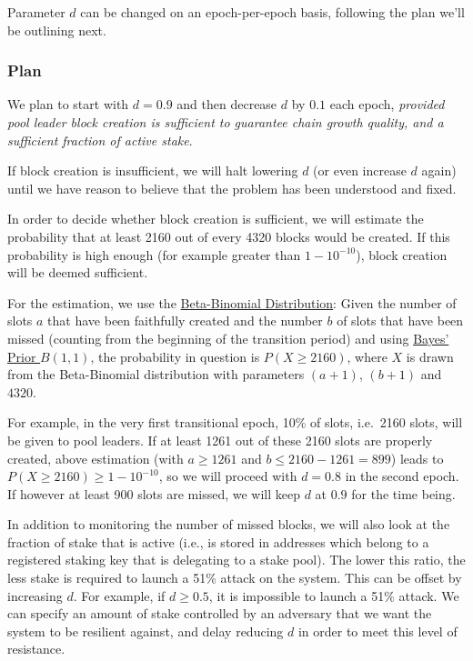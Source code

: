 \documentclass[11pt,a4paper]{article}
\begin{document}
Parameter \(d\) can be changed on an epoch-per-epoch basis, following
the plan we'll be outlining next.

\subsubsection{Plan}
\label{plan}

We plan to start with \(d=0.9\) and then decrease \(d\) by \(0.1\) each
epoch, \emph{provided pool leader block creation is sufficient to
guarantee chain growth quality, and a sufficient fraction of active
stake}.

If block creation is insufficient, we will halt lowering \(d\) (or even
increase \(d\) again) until we have reason to believe that the problem
has been understood and fixed.

In order to decide whether block creation is sufficient, we will
estimate the probability that at least 2160 out of every 4320 blocks
would be created. If this probability is high enough (for example
greater than \(1 - 10^{-10}\)), block creation will be deemed
sufficient.

For the estimation, we use the
\href{https://en.wikipedia.org/wiki/Beta-binomial_distribution}{Beta-Binomial
Distribution}: Given the number of slots \(a\) that have been faithfully
created and the number \(b\) of slots that have been missed (counting
from the beginning of the transition period) and using
\href{https://en.wikipedia.org/wiki/Beta_distribution\#Bayes'_prior_probability_(Beta(1,1))}{Bayes'
Prior \(B(1,1)\)}, the probability in question is \(P(X\geq 2160)\),
where \(X\) is drawn from the Beta-Binomial distribution with parameters
\((a + 1)\), \((b + 1)\) and \(4320\).

For example, in the very first transitional epoch, 10\% of slots,
i.e.~2160 slots, will be given to pool leaders. If at least 1261 out of
these 2160 slots are properly created, above estimation (with
\(a\geq 1261\) and \(b\leq 2160-1261=899\)) leads to
\(P(X\geq 2160)\geq 1-10^{-10}\), so we will proceed with \(d=0.8\) in
the second epoch. If however at least 900 slots are missed, we will keep
\(d\) at \(0.9\) for the time being.

In addition to monitoring the number of missed blocks, we will also look
at the fraction of stake that is active (i.e., is stored in addresses
which belong to a registered staking key that is delegating to a stake
pool). The lower this ratio, the less stake is required to launch a 51\%
attack on the system. This can be offset by increasing \(d\). For
example, if \(d \geq 0.5\), it is impossible to launch a 51\% attack. We
can specify an amount of stake controlled by an adversary that we want
the system to be resilient against, and delay reducing \(d\) in order to
meet this level of resistance.
\end{document}
